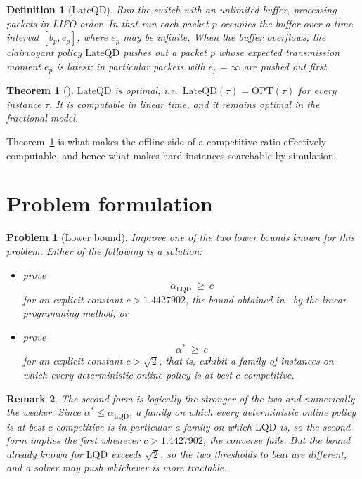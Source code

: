 \documentclass[10pt]{article}
\newtheorem{definition}{Definition}
\newtheorem{problem}{Problem}
\newtheorem{theorem}{Theorem}
\newtheorem{remark}[theorem]{Remark}
\newcommand{\LQD}{\text{LQD}}
\newcommand{\LateQD}{\text{LateQD}}
\newcommand{\OPT}{\text{OPT}}
\begin{document}
\begin{definition}[$\LateQD$]
Run the switch with an unlimited buffer, processing packets in LIFO order. In
that run each packet $p$ occupies the buffer over a time interval
$[b_p,e_p]$, where $e_p$ may be infinite. When the buffer overflows, the
clairvoyant policy $\LateQD$ pushes out a packet $p$ whose expected
transmission moment $e_p$ is latest; in particular packets with $e_p=\infty$
are pushed out first.
\end{definition}

\begin{theorem}[\cite{BDGN19}]\label{thm:lateqd}
$\LateQD$ is optimal, i.e.\ $\LateQD(\tau)=\OPT(\tau)$ for every instance
$\tau$. It is computable in linear time, and it remains optimal in the
fractional model.
\end{theorem}

Theorem~\ref{thm:lateqd} is what makes the offline side of a competitive ratio
effectively computable, and hence what makes hard instances searchable by
simulation.

\section{Problem formulation}

\begin{problem}[Lower bound]\label{prob:lower}
Improve one of the two lower bounds known for this problem. Either of the
following is a solution:
\begin{itemize}
    \item prove
    \[
    \alpha_{\LQD}\ \ge\ c
    \]
    for an explicit constant $c>1.4427902$, the bound obtained
    in~\cite{BDGN19} by the linear programming method; or
    \item prove
    \[
    \alpha^{*}\ \ge\ c
    \]
    for an explicit constant $c>\sqrt{2}$, that is, exhibit a family of
    instances on which \emph{every} deterministic online policy is at best
    $c$-competitive.
\end{itemize}
\end{problem}

\begin{remark}\label{rem:implies}
The second form is logically the stronger of the two and numerically the
weaker. Since $\alpha^{*}\le\alpha_{\LQD}$, a family on which every
deterministic online policy is at best $c$-competitive is in particular a
family on which $\LQD$ is, so the second form implies the first whenever
$c>1.4427902$; the converse fails. But the bound already known for $\LQD$
exceeds $\sqrt2$, so the two thresholds to beat are different, and a solver may
push whichever is more tractable.
\end{remark}
\end{document}
